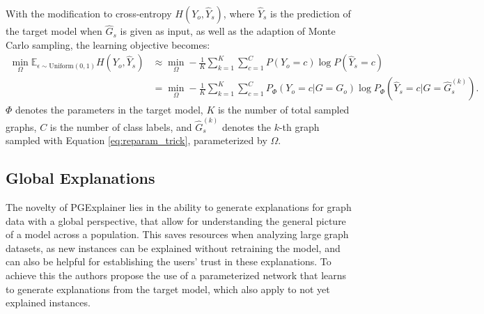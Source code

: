 With the modification to cross-entropy $H(Y_o, \hat{Y}_s)$, where $\hat{Y}_s$ is the prediction of the target model when $\hat{G}_s$ is given as input, as well as the adaption of Monte Carlo sampling, the learning objective becomes:
\begin{equation}
    \label{eq:monte_carlo}
    \begin{aligned}
        \min_\Omega\mathbb{E}_{\epsilon\sim\text{Uniform}(0,1)}H(Y_o, \hat{Y}_s) &\approx \min_\Omega -\frac{1}{K}\sum_{k=1}^K\sum_{c=1}^C P(Y_o = c) \log P(\hat{Y}_s = c) \\
        &= \min_\Omega -\frac{1}{K}\sum_{k=1}^K\sum_{c=1}^C P_\Phi (Y_o = c|G = G_o) \log P_\Phi(\hat{Y}_s = c|G=\hat{G}_s^{(k)}).
    \end{aligned}
    \end{equation}
$\Phi$ denotes the parameters in the target model, $K$ is the number of total sampled graphs, $C$ is the number of class labels, and $\hat{G}_s^{(k)}$ denotes the $k$-th graph sampled with Equation \ref{eq:reparam_trick}, parameterized by $\Omega$. %





\subsection{Global Explanations}
\label{sec:Global_Explanations}
The novelty of PGExplainer lies in the ability to generate explanations for graph data with a global perspective, that allow for understanding the general picture of a model across a population. This saves resources when analyzing large graph datasets, as new instances can be explained without retraining the model, and can also be helpful for establishing the users' trust in these explanations. To achieve this the authors propose the use of a parameterized network that learns to generate explanations from the target model, which also apply to not yet explained instances. 

